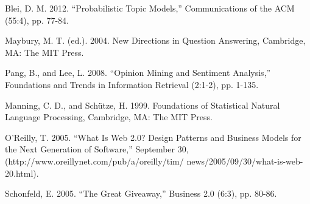 	Blei, D. M. 2012. “Probabilistic Topic Models,” Communications
	of the ACM (55:4), pp. 77-84.
	
	Maybury, M. T. (ed.). 2004. New Directions in Question
	Answering, Cambridge, MA: The MIT Press.
	
	Pang, B., and Lee, L. 2008. “Opinion Mining and Sentiment
	Analysis,” Foundations and Trends in Information Retrieval
	(2:1-2), pp. 1-135.
	
	Manning, C. D., and Schütze, H. 1999. Foundations of Statistical
	Natural Language Processing, Cambridge, MA: The MIT Press.
	
	O’Reilly, T. 2005. “What Is Web 2.0? Design Patterns and
	Business Models for the Next Generation of Software,”
	September 30, (http://www.oreillynet.com/pub/a/oreilly/tim/
	news/2005/09/30/what-is-web-20.html).
	
	Schonfeld, E. 2005. “The Great Giveaway,” Business 2.0 (6:3), pp.
	80-86.




